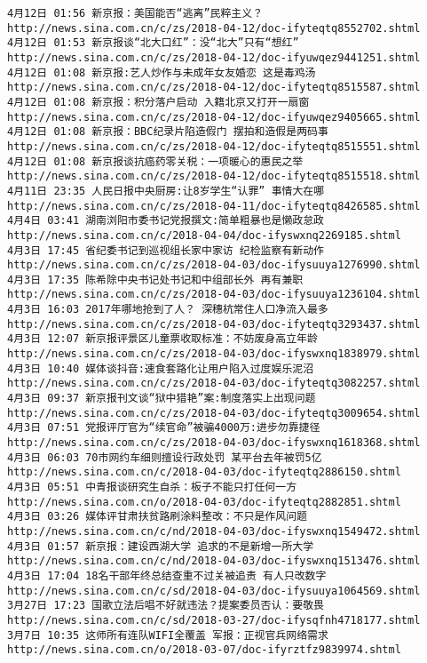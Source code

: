 \documentclass[11pt]{article}
\begin{document}
\begin{Verbatim}[commandchars=\\\{\}]
4月12日 01:56 新京报：美国能否“逃离”民粹主义？ http://news.sina.com.cn/c/zs/2018-04-12/doc-ifyteqtq8552702.shtml
4月12日 01:53 新京报谈“北大口红”：没“北大”只有“想红” http://news.sina.com.cn/c/zs/2018-04-12/doc-ifyuwqez9441251.shtml
4月12日 01:08 新京报:艺人炒作与未成年女友婚恋 这是毒鸡汤 http://news.sina.com.cn/c/zs/2018-04-12/doc-ifyteqtq8515587.shtml
4月12日 01:08 新京报：积分落户启动 入籍北京又打开一扇窗 http://news.sina.com.cn/c/zs/2018-04-12/doc-ifyuwqez9405665.shtml
4月12日 01:08 新京报：BBC纪录片陷造假门 摆拍和造假是两码事 http://news.sina.com.cn/c/zs/2018-04-12/doc-ifyteqtq8515551.shtml
4月12日 01:08 新京报谈抗癌药零关税：一项暖心的惠民之举 http://news.sina.com.cn/c/zs/2018-04-12/doc-ifyteqtq8515518.shtml
4月11日 23:35 人民日报中央厨房:让8岁学生“认罪” 事情大在哪 http://news.sina.com.cn/c/zs/2018-04-11/doc-ifyteqtq8426585.shtml
4月4日 03:41 湖南浏阳市委书记党报撰文:简单粗暴也是懒政怠政 http://news.sina.com.cn/c/2018-04-04/doc-ifyswxnq2269185.shtml
4月3日 17:45 省纪委书记到巡视组长家中家访 纪检监察有新动作 http://news.sina.com.cn/c/zs/2018-04-03/doc-ifysuuya1276990.shtml
4月3日 17:35 陈希除中央书记处书记和中组部长外 再有兼职 http://news.sina.com.cn/c/zs/2018-04-03/doc-ifysuuya1236104.shtml
4月3日 16:03 2017年哪地抢到了人？ 深穗杭常住人口净流入最多 http://news.sina.com.cn/c/zs/2018-04-03/doc-ifyteqtq3293437.shtml
4月3日 12:07 新京报评景区儿童票收取标准：不妨废身高立年龄 http://news.sina.com.cn/c/zs/2018-04-03/doc-ifyswxnq1838979.shtml
4月3日 10:40 媒体谈抖音:速食套路化让用户陷入过度娱乐泥沼 http://news.sina.com.cn/c/zs/2018-04-03/doc-ifyteqtq3082257.shtml
4月3日 09:37 新京报刊文谈“狱中猎艳”案:制度落实上出现问题 http://news.sina.com.cn/c/zs/2018-04-03/doc-ifyteqtq3009654.shtml
4月3日 07:51 党报评厅官为“续官命”被骗4000万:进步勿靠捷径 http://news.sina.com.cn/c/zs/2018-04-03/doc-ifyswxnq1618368.shtml
4月3日 06:03 70市网约车细则擅设行政处罚 某平台去年被罚5亿 http://news.sina.com.cn/c/2018-04-03/doc-ifyteqtq2886150.shtml
4月3日 05:51 中青报谈研究生自杀：板子不能只打任何一方 http://news.sina.com.cn/o/2018-04-03/doc-ifyteqtq2882851.shtml
4月3日 03:26 媒体评甘肃扶贫路刷涂料整改：不只是作风问题 http://news.sina.com.cn/c/nd/2018-04-03/doc-ifyswxnq1549472.shtml
4月3日 01:57 新京报：建设西湖大学 追求的不是新增一所大学 http://news.sina.com.cn/c/nd/2018-04-03/doc-ifyswxnq1513476.shtml
4月3日 17:04 18名干部年终总结查重不过关被追责 有人只改数字 http://news.sina.com.cn/c/sd/2018-04-03/doc-ifysuuya1064569.shtml
3月27日 17:23 国歌立法后唱不好就违法？提案委员否认：要敬畏 http://news.sina.com.cn/c/sd/2018-03-27/doc-ifysqfnh4718177.shtml
3月7日 10:35 这师所有连队WIFI全覆盖 军报：正视官兵网络需求 http://news.sina.com.cn/o/2018-03-07/doc-ifyrztfz9839974.shtml

\end{Verbatim}
\end{document}
